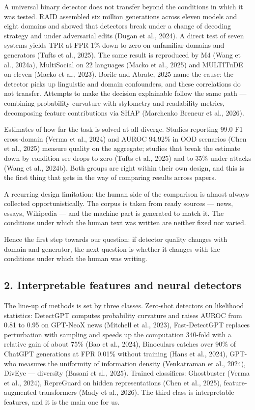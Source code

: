 \documentclass[11pt,a4paper]{article}
\renewcommand{\_}{\textunderscore\allowbreak}
\begin{document}
A universal binary detector does not transfer beyond the conditions in which it
was tested. RAID assembled six million generations across eleven models and eight
domains and showed that detectors break under a change of decoding strategy and
under adversarial edits (Dugan et al., 2024). A direct test of seven systems yields TPR at FPR 1\%
down to zero on unfamiliar domains and generators (Tufts et al., 2025). The same result is
reproduced by M4 (Wang et al., 2024a), MultiSocial on 22 languages (Macko et al., 2025) and MULTITuDE on
eleven (Macko et al., 2023). Borile and Abrate, 2025 name the cause: the detector picks up linguistic
and domain confounders, and these correlations do not transfer. Attempts to make
the decision explainable follow the same path — combining probability curvature
with stylometry and readability metrics, decomposing feature contributions via
SHAP (Marchenko Breneur et al., 2026).

Estimates of how far the task is solved at all diverge. Studies reporting
99.0 F1 cross-domain (Verma et al., 2024) and AUROC 94.92\% in OOD scenarios (Chen et al., 2025) measure
quality on the aggregate; studies that break the estimate down by condition see
drops to zero (Tufts et al., 2025) and to 35\% under attacks (Wang et al., 2024b). Both groups are right
within their own design, and this is the first thing that gets in the way of
comparing results across papers.

A recurring design limitation: the human side of the comparison is almost always
collected opportunistically. The corpus is taken from ready sources — news,
essays, Wikipedia — and the machine part is generated to match it. The conditions
under which the human text was written are neither fixed nor varied.

Hence the first step towards our question: if detector quality changes with
domain and generator, the next question is whether it changes with the
conditions under which the human was writing.

\subsection{2. Interpretable features and neural detectors}

The line-up of methods is set by three classes. Zero-shot detectors on likelihood
statistics: DetectGPT computes probability curvature and raises AUROC from 0.81 to
0.95 on GPT-NeoX news (Mitchell et al., 2023), Fast-DetectGPT replaces perturbation with sampling
and speeds up the computation 340-fold with a relative gain of about 75\% (Bao et al., 2024), Binoculars
catches over 90\% of ChatGPT generations at FPR 0.01\% without training (Hans et al., 2024), GPT-who
measures the uniformity of information density (Venkatraman et al., 2024), DivEye — diversity (Basani et al., 2025).
Trained classifiers: Ghostbuster (Verma et al., 2024), RepreGuard on hidden
representations (Chen et al., 2025), feature-augmented transformers (Mady et al., 2026). The third class is
interpretable features, and it is the main one for us.
\end{document}
